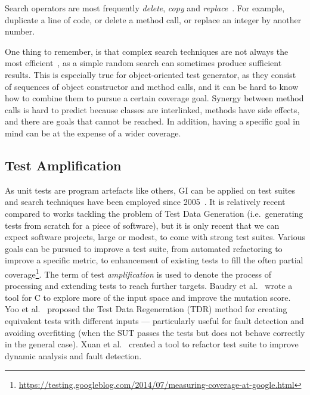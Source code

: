 \documentclass[a4paper,11pt]{sdm_internship}
\newcommand{\CS}{C\nolinebreak\hspace{-.05em}\raisebox{.6ex}{\scriptsize\bf \#}}
\newcommand{\addref}[1]{\colorbox{TealBlue!100}{\textcolor{white}{\textbf{$[$\ifx&#1&\ \else#1\fi$]$}}}}
\theoremstyle{definition}
\begin{document}

Search operators are most frequently \emph{delete}, \emph{copy} and \emph{replace}~\cite{petke2017new}.
For example, duplicate a line of code, or delete a method call, or replace an integer by another number.

One thing to remember, is that complex search techniques are not always the most efficient~\cite{shamshiri2017random}, as a simple random search can sometimes produce sufficient results.
This is especially true for object-oriented test generator, as they consist of sequences of object constructor and method calls, and it can be hard to know how to combine them to pursue a certain coverage goal.
Synergy between method calls is hard to predict because classes are interlinked, methods have side effects, and there are goals that cannot be reached.
In addition, having a specific goal in mind can be at the expense of a wider coverage.

\subsection{Test Amplification}%
\label{ssec:test_amplification}
As unit tests are program artefacts like others, GI can be applied on test suites~\cite{danglot2017emerging} and search techniques have been employed since 2005~\cite{baudry2005automatic}.
It is relatively recent compared to works tackling the problem of Test Data Generation (i.e.\ generating tests from scratch for a piece of software), but it is only recent that we can expect software projects, large or modest, to come with strong test suites.
Various goals can be pursued to improve a test suite, from automated refactoring to improve a specific metric, to enhancement of existing tests to fill the often partial coverage\footnote{\url{https://testing.googleblog.com/2014/07/measuring-coverage-at-google.html}}.
The term of test \emph{amplification} is used to denote the process of processing and extending tests to reach further targets.
Baudry et al.~\cite{baudry2005automatic} wrote a tool for \CS{} to explore more of the input space and improve the mutation score.
Yoo et al.~\cite{yoo2012test} proposed the Test Data Regeneration (TDR) method for creating equivalent tests with different inputs --- particularly useful for fault detection and avoiding overfitting (when the SUT passes the tests but does not behave correctly in the general case).
Xuan et al.~\cite{xuan2015dynamic,xuan2016b} created a tool to refactor test suite to improve dynamic analysis and fault detection.
\end{document}
